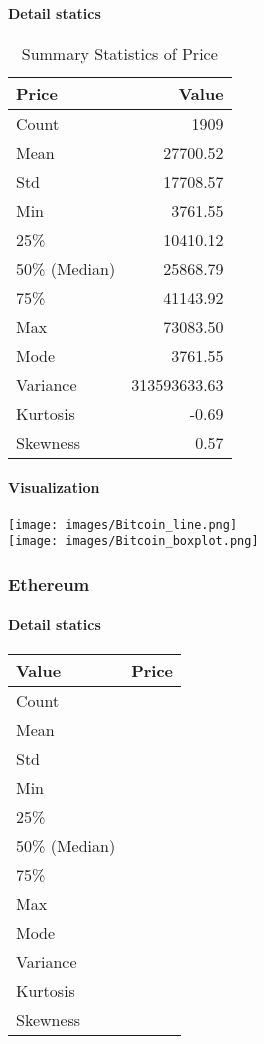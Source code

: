 \documentclass{ieeeojies}
\begin{document}
\paragraph{Detail statics}
\begin{center}
\begin{table}[h!]
\centering
\begin{tabular}{|l|r|}
\hline
\textbf{Price} & \textbf{Value} \\
\hline
Count & 1909 \\
\hline
Mean & 27700.52 \\
\hline
Std & 17708.57 \\
\hline
Min & 3761.55 \\
\hline
25\% & 10410.12 \\
\hline
50\% (Median) & 25868.79 \\
\hline
75\% & 41143.92 \\
\hline
Max & 73083.50 \\
\hline
Mode & 3761.55 \\
\hline
Variance & 313593633.63 \\
\hline
Kurtosis & -0.69 \\
\hline
Skewness & 0.57 \\
\hline
\end{tabular}
\caption{Summary Statistics of Price}
\label{table:summary_statistics}
\end{table}
\end{center}
\paragraph{Visualization}
\texttt{[image: images/Bitcoin\_line.png]}\\
\texttt{[image: images/Bitcoin\_boxplot.png]}
\subsubsection{Ethereum}
\paragraph{Detail statics}
\begin{center}
\begin{tabular}{|l|r|}
\hline
\textbf{Value} & \textbf{Price} \\
\hline
Count &  \\
\hline
Mean & \\
\hline
Std &\\
\hline
Min &  \\
\hline
25\% &  \\
\hline
50\% (Median) &  \\
\hline
75\% & \\
\hline
Max & \\
\hline
Mode & \\
\hline
Variance &  \\
\hline
Kurtosis &  \\
\hline
Skewness &  \\
\hline
\end{tabular}

\end{center}
\end{document}
